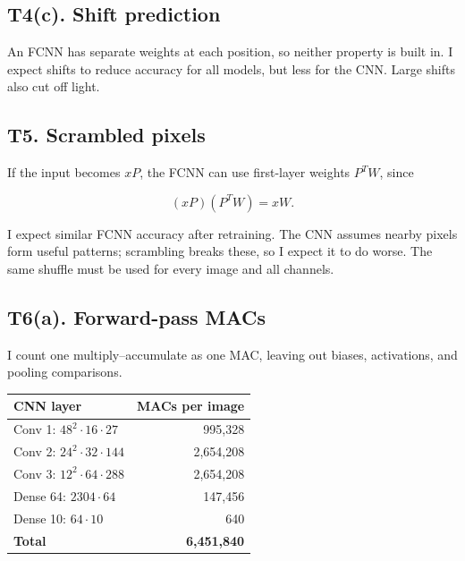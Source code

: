 \documentclass[11pt,a4paper]{article}
\begin{document}

\subsection*{T4(c). Shift prediction}

An FCNN has separate weights at each position, so neither property is built in. I expect shifts to reduce accuracy for all models, but less for the CNN. Large shifts also cut off light.


\subsection*{T5. Scrambled pixels}

If the input becomes $xP$, the FCNN can use first-layer weights $P^TW$, since

\[
(xP)(P^TW)=xW.
\]

I expect similar FCNN accuracy after retraining. The CNN assumes nearby pixels form useful patterns; scrambling breaks these, so I expect it to do worse. The same shuffle must be used for every image and all channels.


\subsection*{T6(a). Forward-pass MACs}

I count one multiply--accumulate as one MAC, leaving out biases, activations, and pooling comparisons.

{\normalsize\setlength{\tabcolsep}{4pt}
\begin{tabularx}{\linewidth}{|L|r|}
\hline
{}
\textbf{CNN layer} & \textbf{MACs per image} \\ \hline
Conv 1: $48^2\cdot16\cdot27$ & 995,328 \\ \hline
Conv 2: $24^2\cdot32\cdot144$ & 2,654,208 \\ \hline
Conv 3: $12^2\cdot64\cdot288$ & 2,654,208 \\ \hline
Dense 64: $2304\cdot64$ & 147,456 \\ \hline
Dense 10: $64\cdot10$ & 640 \\ \hline
\textbf{Total} & \textbf{6,451,840} \\ \hline
\end{tabularx}\par}
\end{document}
